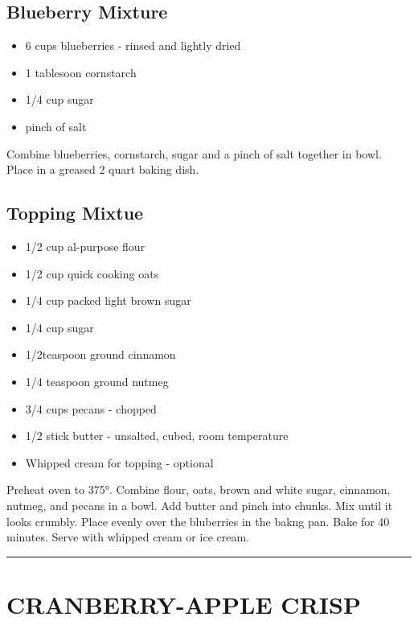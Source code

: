 \documentclass[
]{book}
\providecommand{\tightlist}{%
  \setlength{\itemsep}{0pt}\setlength{\parskip}{0pt}}
\begin{document}
\hypertarget{blueberry-mixture}{%
\subsection*{Blueberry Mixture}\label{blueberry-mixture}}


\begin{itemize}
\tightlist
\item
  6 cups blueberries - rinsed and lightly dried
\item
  1 tablesoon cornstarch
\item
  1/4 cup sugar
\item
  pinch of salt
\end{itemize}

Combine blueberries, cornstarch, sugar and a pinch of salt together in bowl. Place in a greased 2 quart baking dish.

\hypertarget{topping-mixtue}{%
\subsection*{Topping Mixtue}\label{topping-mixtue}}


\begin{itemize}
\tightlist
\item
  1/2 cup al-purpose flour
\item
  1/2 cup quick cooking oats
\item
  1/4 cup packed light brown sugar
\item
  1/4 cup sugar
\item
  1/2teaspoon ground cinnamon
\item
  1/4 teaspoon ground nutmeg
\item
  3/4 cups pecans - chopped
\item
  1/2 stick butter - unsalted, cubed, room temperature
\item
  Whipped cream for topping - optional
\end{itemize}

Preheat oven to 375°. Combine flour, oats, brown and white sugar, cinnamon, nutmeg, and pecans in a bowl. Add butter and pinch into chunks. Mix until it looks crumbly. Place evenly over the bluberries in the bakng pan. Bake for 40 minutes. Serve with whipped cream or ice cream.

\begin{center}\rule{0.5\linewidth}{0.5pt}\end{center}

\hypertarget{cranberry-apple-crisp}{%
\section*{CRANBERRY-APPLE CRISP}\label{cranberry-apple-crisp}}
\end{document}
